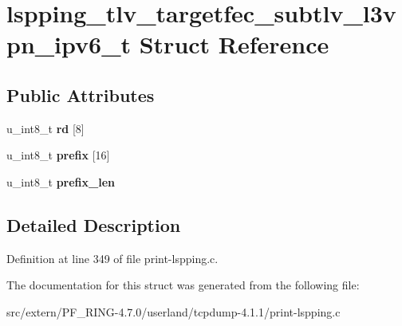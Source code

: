 \hypertarget{structlspping__tlv__targetfec__subtlv__l3vpn__ipv6__t}{
\section{lspping\_\-tlv\_\-targetfec\_\-subtlv\_\-l3vpn\_\-ipv6\_\-t Struct Reference}
\label{structlspping__tlv__targetfec__subtlv__l3vpn__ipv6__t}
}
\subsection*{Public Attributes}
\begin{DoxyCompactItemize}
\item 
\hypertarget{structlspping__tlv__targetfec__subtlv__l3vpn__ipv6__t_a3d2d112cce63b3c4309a1e9bf886751a}{
u\_\-int8\_\-t {\bfseries rd} \mbox{[}8\mbox{]}}
\label{structlspping__tlv__targetfec__subtlv__l3vpn__ipv6__t_a3d2d112cce63b3c4309a1e9bf886751a}

\item 
\hypertarget{structlspping__tlv__targetfec__subtlv__l3vpn__ipv6__t_a0294849011d359f0cd1be98bb1508c6e}{
u\_\-int8\_\-t {\bfseries prefix} \mbox{[}16\mbox{]}}
\label{structlspping__tlv__targetfec__subtlv__l3vpn__ipv6__t_a0294849011d359f0cd1be98bb1508c6e}

\item 
\hypertarget{structlspping__tlv__targetfec__subtlv__l3vpn__ipv6__t_a765386b11ed59f3393243f35ac282dcf}{
u\_\-int8\_\-t {\bfseries prefix\_\-len}}
\label{structlspping__tlv__targetfec__subtlv__l3vpn__ipv6__t_a765386b11ed59f3393243f35ac282dcf}

\end{DoxyCompactItemize}


\subsection{Detailed Description}


Definition at line 349 of file print-\/lspping.c.



The documentation for this struct was generated from the following file:\begin{DoxyCompactItemize}
\item 
src/extern/PF\_\-RING-\/4.7.0/userland/tcpdump-\/4.1.1/print-\/lspping.c\end{DoxyCompactItemize}
